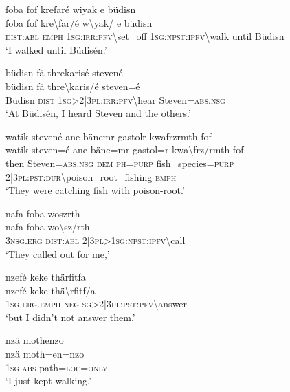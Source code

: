 \ea\label{ex:13:a1287}
foba fof krefaré wiyak e büdisn\\
\gll foba	fof	kre{\textbackslash}far/é	w{\textbackslash}yak/	e	büdisn\\
     \textsc{dist}:\textsc{abl}	\textsc{emph}	1\textsc{sg}:\textsc{irr}:\textsc{pfv}{\textbackslash}set\_off	1\textsc{sg}:\textsc{npst}:\textsc{ipfv}{\textbackslash}walk	until	Büdisn\\
\glt `I walked until Büdisén.'
\z

\ea\label{ex:13:a1288}
büdisn fä threkarisé stevené\\
\gll büdisn	fä	thre{\textbackslash}karis/é	steven=é\\
     Büdisn	\textsc{dist}	1\textsc{sg}>2|3\textsc{pl}:\textsc{irr}:\textsc{pfv}{\textbackslash}hear	Steven=\textsc{abs}.\textsc{nsg}\\
\glt `At Büdisén, I heard Steven and the others.'
\z

\ea\label{ex:13:a1289}
watik stevené ane bänemr gastolr kwafrzrmth fof\\
\gll watik	steven=é	ane	bäne=mr	gastol=r	kwa{\textbackslash}frz/rmth	fof\\
     then	Steven=\textsc{abs}.\textsc{nsg}	\textsc{dem}	\textsc{ph}=\textsc{purp}	fish\_species=\textsc{purp}	2|3\textsc{pl}:\textsc{pst}:\textsc{dur}{\textbackslash}poison\_root\_fishing	\textsc{emph}\\
\glt `They were catching fish with poison-root.'
\z

\ea\label{ex:13:a1290}
nafa foba woszrth\\
\gll nafa	foba	wo{\textbackslash}sz/rth\\
     3\textsc{nsg}.\textsc{erg}	\textsc{dist}:\textsc{abl}	2|3\textsc{pl}>1\textsc{sg}:\textsc{npst}:\textsc{ipfv}{\textbackslash}call\\
\glt `They called out for me,'
\z

\ea\label{ex:13:a1291}
nzefé keke thärfitfa\\
\gll nzefé	keke	thä{\textbackslash}rfitf/a\\
     1\textsc{sg}.\textsc{erg}.\textsc{emph}	\textsc{neg}	\textsc{sg}>2|3\textsc{pl}:\textsc{pst}:\textsc{pfv}{\textbackslash}answer\\
\glt `but I didn't not answer them.'
\z

\ea\label{ex:13:a1292}
nzä mothenzo\\
\gll nzä	moth=en=nzo\\
     1\textsc{sg}.\textsc{abs}	path=\textsc{loc}=\textsc{only}\\
\glt `I just kept walking.'
\z

